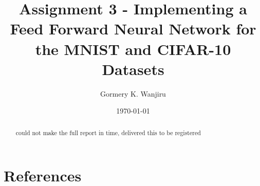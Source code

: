 \documentclass[11pt, a4paper]{article}
\title{Assignment 3 - Implementing a Feed Forward Neural Network for the MNIST and CIFAR-10 Datasets}
\author{Gormery K. Wanjiru}
\date{\today}
\begin{document}
\maketitle

\begin{abstract}
    could not make the full report in time, delivered this to be registered
\end{abstract}


\section*{References}
\end{document}
